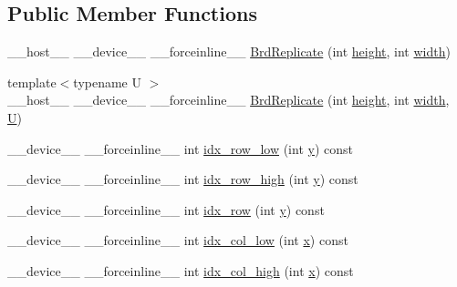 \subsection*{Public Member Functions}
\begin{DoxyCompactItemize}
\item 
\-\_\-\-\_\-host\-\_\-\-\_\- \-\_\-\-\_\-device\-\_\-\-\_\- \-\_\-\-\_\-forceinline\-\_\-\-\_\- \hyperlink{structcv_1_1gpu_1_1device_1_1BrdReplicate_a1fb88ef7f849b070fff3fffcbd958e84}{Brd\-Replicate} (int \hyperlink{highgui__c_8h_adc7b4b8a6ef510e136071efbc9cd9a58}{height}, int \hyperlink{highgui__c_8h_a2474a5474cbff19523a51eb1de01cda4}{width})
\item 
{\footnotesize template$<$typename U $>$ }\\\-\_\-\-\_\-host\-\_\-\-\_\- \-\_\-\-\_\-device\-\_\-\-\_\- \-\_\-\-\_\-forceinline\-\_\-\-\_\- \hyperlink{structcv_1_1gpu_1_1device_1_1BrdReplicate_aaccdfc49f77500d067e3ba2d20f7d9dc}{Brd\-Replicate} (int \hyperlink{highgui__c_8h_adc7b4b8a6ef510e136071efbc9cd9a58}{height}, int \hyperlink{highgui__c_8h_a2474a5474cbff19523a51eb1de01cda4}{width}, \hyperlink{core__c_8h_aa9c521f41af9a5191e5e4b6ffbae211a}{U})
\item 
\-\_\-\-\_\-device\-\_\-\-\_\- \-\_\-\-\_\-forceinline\-\_\-\-\_\- int \hyperlink{structcv_1_1gpu_1_1device_1_1BrdReplicate_a8b76a54ae4e547c2fe579b0b3499f840}{idx\-\_\-row\-\_\-low} (int \hyperlink{highgui__c_8h_af1202c02b14870c18fb3a1da73e9e7c7}{y}) const 
\item 
\-\_\-\-\_\-device\-\_\-\-\_\- \-\_\-\-\_\-forceinline\-\_\-\-\_\- int \hyperlink{structcv_1_1gpu_1_1device_1_1BrdReplicate_a5a51d62b901428b1a57e21856c443562}{idx\-\_\-row\-\_\-high} (int \hyperlink{highgui__c_8h_af1202c02b14870c18fb3a1da73e9e7c7}{y}) const 
\item 
\-\_\-\-\_\-device\-\_\-\-\_\- \-\_\-\-\_\-forceinline\-\_\-\-\_\- int \hyperlink{structcv_1_1gpu_1_1device_1_1BrdReplicate_aeece666b32c8aa3cffe77ef4b76a0277}{idx\-\_\-row} (int \hyperlink{highgui__c_8h_af1202c02b14870c18fb3a1da73e9e7c7}{y}) const 
\item 
\-\_\-\-\_\-device\-\_\-\-\_\- \-\_\-\-\_\-forceinline\-\_\-\-\_\- int \hyperlink{structcv_1_1gpu_1_1device_1_1BrdReplicate_abf0b0b6b11a82acb8634911080bb43ad}{idx\-\_\-col\-\_\-low} (int \hyperlink{highgui__c_8h_a6150e0515f7202e2fb518f7206ed97dc}{x}) const 
\item 
\-\_\-\-\_\-device\-\_\-\-\_\- \-\_\-\-\_\-forceinline\-\_\-\-\_\- int \hyperlink{structcv_1_1gpu_1_1device_1_1BrdReplicate_afe4de9667df19d1721877d0b73c5af3e}{idx\-\_\-col\-\_\-high} (int \hyperlink{highgui__c_8h_a6150e0515f7202e2fb518f7206ed97dc}{x}) const 

\end{DoxyCompactItemize}
